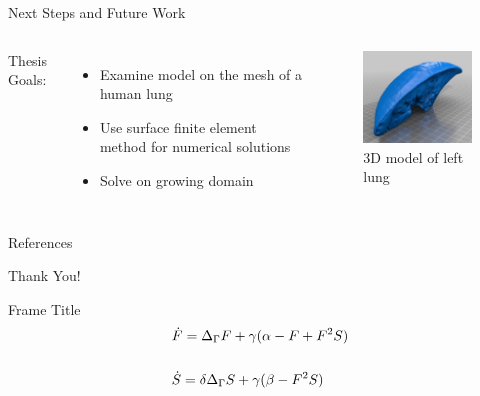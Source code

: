 \documentclass{beamer}
\begin{document}
            \begin{frame}{Next Steps and Future Work}
            
                \vfill
            
                \begin{columns}
                
                    {\Large Thesis Goals:}
                    \vspace{5mm}
                    \begin{itemize}
                    \item Examine model on the mesh of a human lung
                    \item Use surface finite element method for numerical solutions
                    \item Solve on growing domain
                    \end{itemize}
                    
                    \begin{figure}
                            \centering
                            \includegraphics[width = 5cm, frame]{Images/v2lung03.jpg}
                            \caption{3D model of left lung}
                        \end{figure}
                    
                
                \end{columns}
                \vfill
            
            \end{frame}
            
            \appendix
            
            \begin{frame}{References}
                \nocite{*}
                
                
            \end{frame}
    
            \begin{frame}[focus]
                Thank You!
            \end{frame}
    
\begin{frame}{Frame Title}
    \Large
        \begin{align*}
        &\Huge{\dot{F} = \Delta_\Gamma F + \gamma (\alpha - F + F^2S)} \\
        \\
        &\dot{S} = \delta\Delta_\Gamma S + \gamma (\beta - F^2S)\\
    \end{align*}
    
\end{frame}
    
\end{document}
